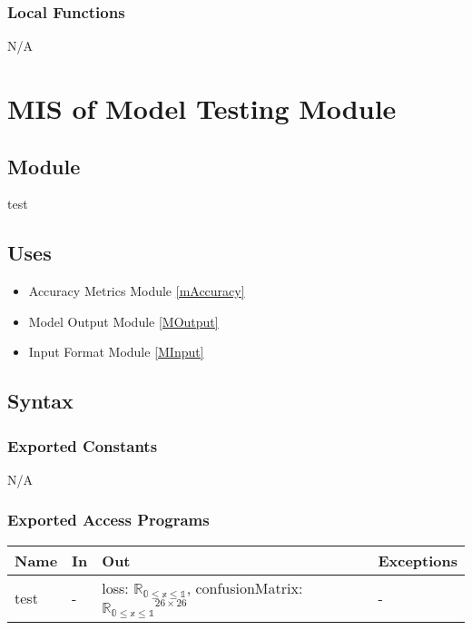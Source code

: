\documentclass[12pt, titlepage]{article}
\begin{document}
\subsubsection{Local Functions}

N/A


\section{MIS of Model Testing Module} \label{MTesting}

\subsection{Module}

test

\subsection{Uses}

\begin{itemize}
  \item Accuracy Metrics Module \ref{mAccuracy}
  \item Model Output Module \ref{MOutput}
  \item Input Format Module \ref{MInput}
\end{itemize}

\subsection{Syntax}

\subsubsection{Exported Constants}

N/A

\subsubsection{Exported Access Programs}

\begin{center}
\begin{tabular}{p{2cm} p{2cm} p{8cm} p{2cm}}
\hline
\textbf{Name} & \textbf{In} & \textbf{Out} & \textbf{Exceptions} \\
\hline
test & - & loss: $\mathbb{R_{\text{0} \leq \text{x} \leq \text{1}}}$, confusionMatrix: $\mathbb{R_{\text{0} \leq \text{x} \leq \text{1}}}^{26 \times 26}$ & - \\
\hline
\end{tabular}
\end{center}
\end{document}
